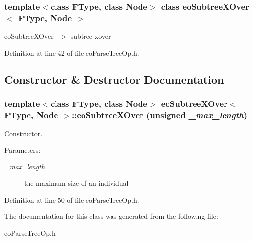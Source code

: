 \subsubsection*{template$<$class FType, class Node$>$ class eo\-Subtree\-XOver$<$ FType, Node $>$}

eo\-Subtree\-XOver --$>$ subtree xover 



Definition at line 42 of file eo\-Parse\-Tree\-Op.h.

\subsection{Constructor \& Destructor Documentation}
\subsubsection{\setlength{\rightskip}{0pt plus 5cm}template$<$class FType, class Node$>$ {\bf eo\-Subtree\-XOver}$<$ FType, Node $>$::{\bf eo\-Subtree\-XOver} (unsigned {\em \_\-max\_\-length})\hspace{0.3cm}{\tt  [inline]}}\label{classeo_subtree_x_over_a0}


Constructor. 

\begin{Desc}
\item[Parameters:]
\begin{description}
\item[{\em \_\-max\_\-length}]the maximum size of an individual \end{description}
\end{Desc}


Definition at line 50 of file eo\-Parse\-Tree\-Op.h.

The documentation for this class was generated from the following file:\begin{CompactItemize}
\item 
eo\-Parse\-Tree\-Op.h\end{CompactItemize}
